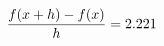 \documentclass[preview]{standalone}
\begin{document}
\begin{align*}
\special{dvisvgm:raw <g id='unique000'>}\frac{f(x+h)-f(x)}{h} = 2.221\special{dvisvgm:raw </g>}
\end{align*}
\end{document}
